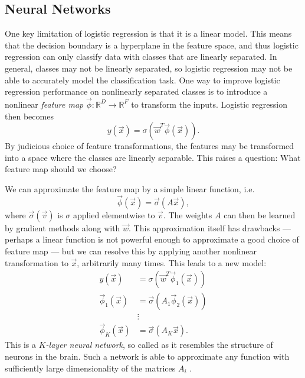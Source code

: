     \subsection{Neural Networks}
    \label{sec:neural-networks}

        One key limitation of logistic regression is that it is a linear model.
        This means that the decision boundary is a hyperplane in the feature
        space, and thus logistic regression can only classify data with classes
        that are linearly separated. In general, classes may not be linearly
        separated, so logistic regression may not be able to accurately model
        the classification task. One way to improve logistic regression
        performance on nonlinearly separated classes is to introduce a nonlinear
        \emph{feature map} $\vec\phi : \mathbb{R}^D \to \mathbb{R}^F$ to
        transform the inputs. Logistic regression then becomes
        \[
            y(\vec x) = \sigma(\vec w^T \vec\phi(\vec x)).
        \]
        By judicious choice of feature transformations, the features may be
        transformed into a space where the classes are linearly separable. This
        raises a question: What feature map should we choose?

        We can approximate the feature map by a simple linear function, i.e.
        \[
            \vec\phi(\vec x) = \vec\sigma(A \vec x),
        \]
        where $\vec\sigma(\vec v)$ is $\sigma$ applied elementwise to $\vec v$.
        The weights $A$ can then be learned by gradient methods along with $\vec
        w$. This approximation itself has drawbacks --- perhaps a linear
        function is not powerful enough to approximate a good choice of feature
        map --- but we can resolve this by applying another nonlinear
        transformation to $\vec x$, arbitrarily many times. This leads to a new
        model:
        \begin{align*}
            y(\vec x) &= \sigma(\vec w^T \vec\phi_1(\vec x))\\
            \vec\phi_1(\vec x) &= \vec\sigma(A_1 \vec\phi_2(\vec x))\\
            &\vdots\\
            \vec\phi_K(\vec x) &= \vec\sigma(A_K \vec x).
        \end{align*}
        This is a \emph{$K$-layer neural network}, so called as it resembles
        the structure of neurons in the brain. Such a network is able to
        approximate any function with sufficiently large dimensionality of the
        matrices $A_i$ \citep{gybenko89}.

